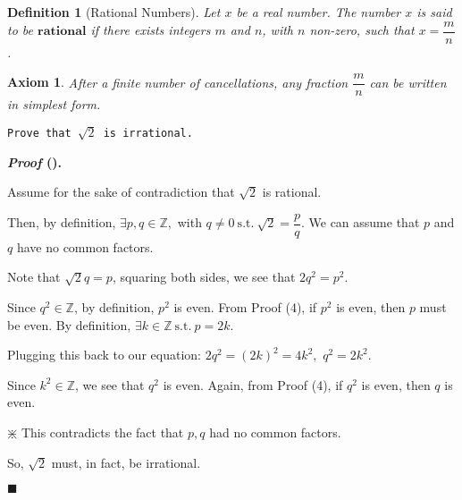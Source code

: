 \documentclass[12pt,a4paper]{article}
\newcounter{nprf}[subsection]
\newtheorem{df}{Definition}[subsection]
\newtheorem{ax}{Axiom}[section]
\newenvironment*{prf}{\par\indent\textbf{\textit{Proof} (\stepcounter{nprf}\thenprf). }\par}{\par\hfill $\blacksquare$\par}
\def\Z{{\mathbb{Z}}}
\def\st{\ \mathrm{s.t.}\ }
\begin{document}
\begin{df}[Rational Numbers]
	Let $x$ be a real number. The number $x$ is said to be $\textbf{rational}$ if there exists integers $m$ and $n$, with $n$ non-zero, such that $x=\dfrac{m}{n}$.	
\end{df}
\begin{ax}
	After a finite number of cancellations, any	fraction $\dfrac{m}{n}$ can be written in simplest form. 
\end{ax}
\begin{framed}
\noindent\texttt{Prove that $\sqrt{2}$ is irrational.}
\begin{prf}
	Assume for the sake of contradiction that $\sqrt{2}$ is rational. \par Then, by definition, $\exists p,q\in\Z,$ with $q\neq0\st\sqrt{2}=\dfrac{p}{q}$. We can assume that $p$ and $q$ have no common factors. \par Note that $\sqrt{2}q=p$, squaring both sides, we see that $2q^2=p^2$.\par Since $q^2\in\Z$, by definition, $p^2$ is even. From Proof (4), if $p^2$ is even, then $p$ must be even. By definition, $\exists k\in\Z\st p=2k.$\par Plugging this back to our equation: $2q^2=(2k)^2=4k^2,$ $q^2=2k^2$.\par Since $k^2\in\Z$, we see that $q^2$ is even. Again, from Proof (4), if $q^2$ is even, then $q$ is even. \par \begin{center}{\huge$\divideontimes$} This contradicts the fact that $p,q$ had no common factors.\end{center}\par So, $\sqrt{2}$ must, in fact, be irrational. 
\end{prf}	
\end{framed}
\end{document}
